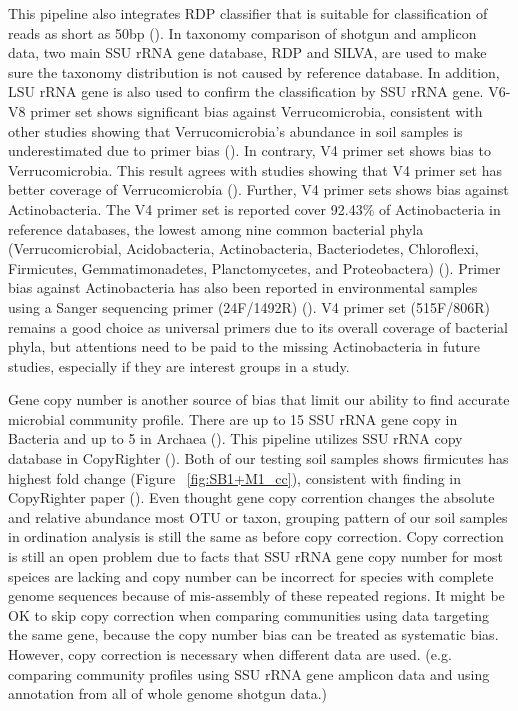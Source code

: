 \documentclass[12pt]{article}
\begin{document}
  This pipeline also integrates RDP classifier that is suitable for classification of reads as short as 50bp (\cite{rdpclassifier}). In taxonomy comparison of shotgun and amplicon data, two main SSU rRNA gene database, RDP and SILVA, are used to make sure the taxonomy distribution is not caused by reference database. In addition, LSU rRNA gene is also used to confirm the classification by SSU rRNA gene. V6-V8 primer set shows significant bias against Verrucomicrobia, consistent with other studies showing that Verrucomicrobia’s abundance in soil samples is underestimated due to primer bias (\cite{verruco2011}). In contrary, V4 primer set shows bias to Verrucomicrobia. This result agrees with studies showing that V4 primer set has better coverage of Verrucomicrobia (\cite{verruco2011}). Further, V4 primer sets shows bias against Actinobacteria. The V4 primer set is reported cover 92.43\% of Actinobacteria in reference databases, the lowest among nine common bacterial phyla (Verrucomicrobial, Acidobacteria, Actinobacteria, Bacteriodetes, Chloroflexi, Firmicutes, Gemmatimonadetes, Planctomycetes, and Proteobactera) (\cite{verruco2011}). Primer bias against Actinobacteria has also been reported in environmental samples using a Sanger sequencing primer (24F/1492R) (\cite{actinobias}). V4 primer set (515F/806R) remains a good choice as universal primers due to its overall coverage of bacterial phyla, but attentions need to be paid to the missing Actinobacteria in future studies, especially if they are interest groups in a study.

  Gene copy number is another source of bias that limit our ability to find accurate microbial community profile. There are up to 15 SSU rRNA gene copy in Bacteria and up to 5 in Archaea (\cite{rrncopy2004}). This pipeline utilizes SSU rRNA copy database in CopyRighter (\cite{copyrighter}). Both of our testing soil samples shows firmicutes has highest fold change (Figure ~\ref{fig:SB1+M1_cc}), consistent with finding in CopyRighter paper (\cite{copyrighter}). Even thought gene copy corrention changes the absolute and relative abundance most OTU or taxon, grouping pattern of our soil samples in ordination analysis is still the same as before copy correction. Copy correction is still an open problem due to facts that SSU rRNA gene copy number for most speices are lacking and copy number can be incorrect for species with complete genome sequences because of mis-assembly of these repeated regions. It might be OK to skip copy correction when comparing communities using data targeting the same gene, because the copy number bias can be treated as systematic bias. However, copy correction is necessary when different data are used. (e.g. comparing community profiles using SSU rRNA gene amplicon data and using annotation from all of whole genome shotgun data.)
\end{document}
